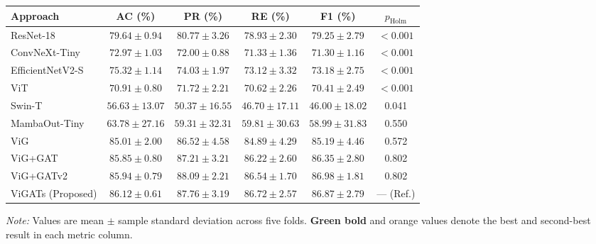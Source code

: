 \documentclass[]{interact}
\theoremstyle{plain}
\theoremstyle{definition}
\theoremstyle{remark}
\newcommand{\bestresult}[1]{\textcolor{bestgreen}{\textbf{#1}}}
\newcommand{\secondresult}[1]{\textcolor{secondorange}{#1}}
\begin{document}
{\begin{table}[H]
\footnotesize
\setlength{\tabcolsep}{3.0pt}
{\begin{tabular}{lccccc} \toprule
\textbf{Approach} & \textbf{AC (\%)} & \textbf{PR (\%)} & \textbf{RE (\%)} & \textbf{F1 (\%)} & \textbf{$p_{\mathrm{Holm}}$} \\ \midrule
ResNet-18 \citep{he2016deep} & $79.64 \pm 0.94$ & $80.77 \pm 3.26$ & $78.93 \pm 2.30$ & $79.25 \pm 2.79$ & $< 0.001$ \\
ConvNeXt-Tiny \citep{liu2022convnext} & $72.97 \pm 1.03$ & $72.00 \pm 0.88$ & $71.33 \pm 1.36$ & $71.30 \pm 1.16$ & $< 0.001$ \\
EfficientNetV2-S \citep{tan2021efficientnetv2} & $75.32 \pm 1.14$ & $74.03 \pm 1.97$ & $73.12 \pm 3.32$ & $73.18 \pm 2.75$ & $< 0.001$ \\
ViT \citep{dosovitskiy2020image} & $70.91 \pm 0.80$ & $71.72 \pm 2.21$ & $70.62 \pm 2.26$ & $70.41 \pm 2.49$ & $< 0.001$ \\
Swin-T \citep{liu2021swin} & $56.63 \pm 13.07$ & $50.37 \pm 16.55$ & $46.70 \pm 17.11$ & $46.00 \pm 18.02$ & 0.041 \\
MambaOut-Tiny \citep{yu2024mambaout} & $63.78 \pm 27.16$ & $59.31 \pm 32.31$ & $59.81 \pm 30.63$ & $58.99 \pm 31.83$ & 0.550 \\
ViG \citep{han2022vision} & $85.01 \pm 2.00$ & $86.52 \pm 4.58$ & $84.89 \pm 4.29$ & $85.19 \pm 4.46$ & 0.572 \\
ViG+GAT \citep{velickovic2018graph} & $85.85 \pm 0.80$ & $87.21 \pm 3.21$ & $86.22 \pm 2.60$ & $86.35 \pm 2.80$ & 0.802 \\
ViG+GATv2 \citep{brody2022gat} & \secondresult{$85.94 \pm 0.79$} & \bestresult{$88.09 \pm 2.21$} & \secondresult{$86.54 \pm 1.70$} & \bestresult{$86.98 \pm 1.81$} & 0.802 \\
ViGATs (Proposed) & \bestresult{$86.12 \pm 0.61$} & \secondresult{$87.76 \pm 3.19$} & \bestresult{$86.72 \pm 2.57$} & \secondresult{$86.87 \pm 2.79$} & --- (Ref.) \\
\bottomrule
\end{tabular}}
\label{tab:plantraw}
\parbox{\textwidth}{\vspace{2pt}\footnotesize\textit{Note:} Values are mean $\pm$ sample standard deviation across five folds. \bestresult{Green bold} and \secondresult{orange} values denote the best and second-best result in each metric column.}
\end{table}

}
\end{document}
